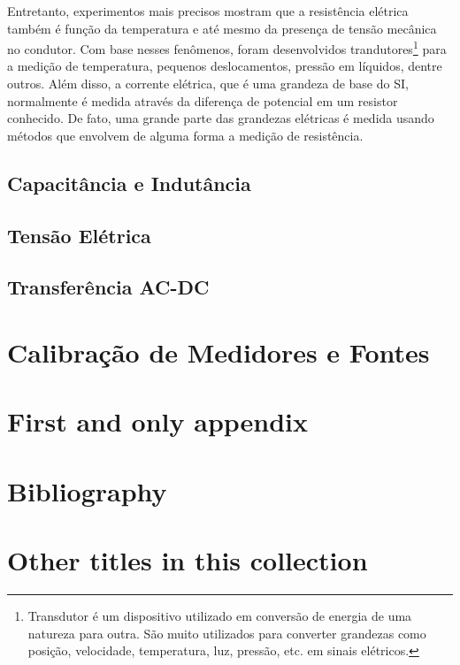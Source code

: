 \documentclass{book}
\begin{document}
Entretanto, experimentos mais precisos mostram que a resistência elétrica também é função da temperatura e até mesmo da presença de tensão mecânica no condutor. Com base nesses fenômenos, foram desenvolvidos trandutores\footnote{Transdutor é um dispositivo utilizado em conversão de energia de uma natureza para outra. São muito utilizados para converter grandezas como posição, velocidade, temperatura, luz, pressão, etc. em sinais elétricos.} para a medição de temperatura, pequenos deslocamentos, pressão em líquidos, dentre outros. Além disso, a corrente elétrica, que é uma grandeza de base do SI, normalmente é medida através da diferença de potencial em um resistor conhecido. De fato, uma grande parte das grandezas elétricas é medida usando métodos que envolvem de alguma forma a medição de resistência.

\section{Capacitância e Indutância}
\section{Tensão Elétrica}
\section{Transferência AC-DC}
\chapter{Calibração de Medidores e Fontes}


\appendix
\chapter{First and only appendix}

\backmatter
\chapter{Bibliography}
\chapter{Other titles in this collection}
\end{document}
